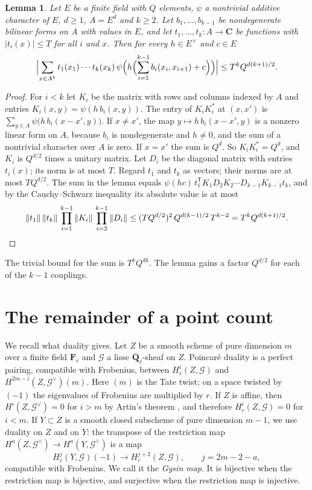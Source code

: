 \documentclass[11pt,a4paper]{article}
\theoremstyle{plain}
\newtheorem{lemma}[theorem]{Lemma}
\theoremstyle{remark}
\newcommand{\Ql}{\overline{\mathbf Q}_\ell}
\newcommand{\G}{\mathcal G}
\begin{document}
\begin{lemma}\label{lem:parseval}
Let $E$ be a finite field with $Q$ elements, $\psi$ a nontrivial additive character of $E$, $d\ge1$, $A=E^d$ and
$k\ge2$. Let $b_1,\dots,b_{k-1}$ be nondegenerate bilinear forms on $A$ with values in $E$, and let
$t_1,\dots,t_k:A\to\mathbf C$ be functions with $|t_i(x)|\le T$ for all $i$ and $x$. Then for every $h\in E^\times$
and $c\in E$
\[
\Bigl|\sum_{x\in A^k}t_1(x_1)\cdots t_k(x_k)\,\psi\Bigl(h\Bigl(\sum_{i=1}^{k-1}b_i(x_i,x_{i+1})+c\Bigr)\Bigr)\Bigr|
\le T^kQ^{d(k+1)/2}.
\]
\end{lemma}

\begin{proof}
For $i<k$ let $K_i$ be the matrix with rows and columns indexed by $A$ and entries $K_i(x,y)=\psi(h\,b_i(x,y))$. The
entry of $K_iK_i^*$ at $(x,x')$ is $\sum_{y\in A}\psi\bigl(h\,b_i(x-x',y)\bigr)$. If $x\ne x'$, the map
$y\mapsto h\,b_i(x-x',y)$ is a nonzero linear form on $A$, because $b_i$ is nondegenerate and $h\ne0$, and the sum
of a nontrivial character over $A$ is zero. If $x=x'$ the sum is $Q^d$. So $K_iK_i^*=Q^d$, and $K_i$ is $Q^{d/2}$
times a unitary matrix. Let $D_i$ be the diagonal matrix with entries $t_i(x)$; its norm is at most $T$. Regard
$t_1$ and $t_k$ as vectors; their norms are at most $TQ^{d/2}$. The sum in the lemma equals
$\psi(hc)\,t_1^{\mathsf T}K_1D_2K_2\cdots D_{k-1}K_{k-1}t_k$, and by the Cauchy--Schwarz inequality its absolute value
is at most
\[
\|t_1\|\,\|t_k\|\,\prod_{i=1}^{k-1}\|K_i\|\,\prod_{i=2}^{k-1}\|D_i\|\le(TQ^{d/2})^2\,Q^{d(k-1)/2}\,T^{k-2}
=T^kQ^{d(k+1)/2}.\qedhere
\]
\end{proof}

The trivial bound for the sum is $T^kQ^{dk}$. The lemma gains a factor $Q^{d/2}$ for each of the $k-1$ couplings.

\section{The remainder of a point count}\label{sec:remainder}

We recall what duality gives. Let $Z$ be a smooth scheme of pure dimension $m$ over a finite field $\mathbf F_r$ and
$\G$ a lisse $\Ql$-sheaf on $Z$. Poincar\'e duality \cite[XVIII, \S3]{SGA4} is a perfect pairing, compatible with
Frobenius, between $H^i_c(Z,\G)$ and $H^{2m-i}(Z,\G^\vee)(m)$. Here $(m)$ is the Tate twist; on a space twisted by
$(-1)$ the eigenvalues of Frobenius are multiplied by $r$. If $Z$ is affine, then $H^i(Z,\G^\vee)=0$ for $i>m$ by
Artin's theorem \cite[XIV, 3.1]{SGA4}, and therefore $H^i_c(Z,\G)=0$ for $i<m$. If $Y\subset Z$ is a smooth closed
subscheme of pure dimension $m-1$, we use duality on $Z$ and on $Y$: the transpose of the restriction map
$H^a(Z,\G^\vee)\to H^a(Y,\G^\vee)$ is a map
\[
H^j_c(Y,\G)(-1)\longrightarrow H^{j+2}_c(Z,\G),\qquad j=2m-2-a,
\]
compatible with Frobenius. We call it the \emph{Gysin map}. It is bijective when the restriction map is bijective,
and surjective when the restriction map is injective.
\end{document}
